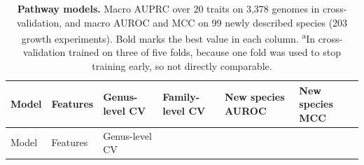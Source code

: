 \documentclass[10pt,a4paper,onecolumn]{article}
\begin{document}
\begingroup\small{}\renewcommand{\arraystretch}{1.25}

\begin{longtable}[]{@{}
  >{\raggedright\arraybackslash}p{}
  >{\raggedright\arraybackslash}p{}
  >{\raggedleft\arraybackslash}p{}
  >{\raggedleft\arraybackslash}p{}
  >{\raggedleft\arraybackslash}p{}
  >{\raggedleft\arraybackslash}p{}@{}}
\caption{\textbf{Pathway models.} Macro AUPRC over 20 traits on 3,378
genomes in cross-validation, and macro AUROC and MCC on 99 newly
described species (203 growth experiments). Bold marks the best value in
each column. \textsuperscript{a}In cross-validation trained on three of
five folds, because one fold was used to stop training early, so not
directly comparable. \label{tab:pathway}}\tabularnewline
\toprule\noalign{}
\begin{minipage}[b]{\linewidth}\raggedright
Model
\end{minipage} & \begin{minipage}[b]{\linewidth}\raggedright
Features
\end{minipage} & \begin{minipage}[b]{\linewidth}\raggedleft
Genus-level CV
\end{minipage} & \begin{minipage}[b]{\linewidth}\raggedleft
Family-level CV
\end{minipage} & \begin{minipage}[b]{\linewidth}\raggedleft
New species AUROC
\end{minipage} & \begin{minipage}[b]{\linewidth}\raggedleft
New species MCC
\end{minipage} \\
\midrule\noalign{}
\endfirsthead
\toprule\noalign{}
\begin{minipage}[b]{\linewidth}\raggedright
Model
\end{minipage} & \begin{minipage}[b]{\linewidth}\raggedright
Features
\end{minipage} & \begin{minipage}[b]{\linewidth}\raggedleft
Genus-level CV
\end{minipage} & \begin{minipage}[b]{\linewidth}\raggedleft

\end{minipage}
\end{longtable}
\end{document}
